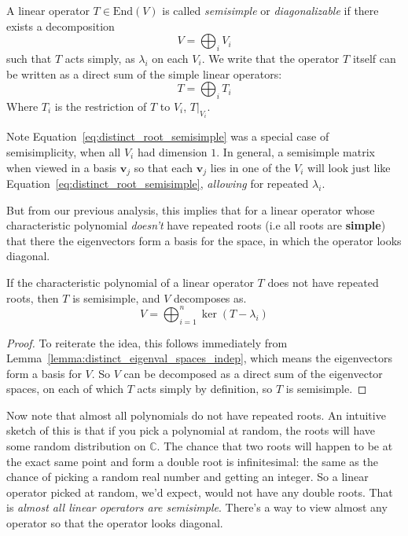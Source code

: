 	\begin{defn}[Semisimplicity]
		A linear operator $T \in \mathrm{End}(V)$ is called \emph{semisimple} or \emph{diagonalizable} if there exists a decomposition 
		\begin{equation}
			V = \bigoplus_i V_i
		\end{equation}
		such that $T$ acts simply, as $\lambda_i$ on each $V_i$. We write that the operator $T$ itself can be written as a direct sum of the simple linear operators:
		\begin{equation}
			T = \bigoplus_i T_i
		\end{equation}
		Where $T_i$ is the restriction of $T$ to $V_i$, $T|_{V_i}$.
	\end{defn}
	
	
	Note Equation~\eqref{eq:distinct_root_semisimple} was a special case of semisimplicity, when all $V_i$ had dimension $1$. In general, a semisimple matrix when viewed in a basis $\mathbf v_j$ so that each $\mathbf v_j$ lies in one of the $V_i$ will look just like Equation~\eqref{eq:distinct_root_semisimple}, \emph{allowing} for repeated $\lambda_i$.
	
	But from our previous analysis, this implies that for a linear operator whose characteristic polynomial \emph{doesn't} have repeated roots (i.e  all roots are \textbf{simple}) that there the eigenvectors form a basis for the space, in which the operator looks diagonal. 
	\begin{theorem}\label{thm:semisimple_lacking_repeated_eigs}
		If the characteristic polynomial of a linear operator $T$ does not have repeated roots, then $T$ is semisimple, and $V$ decomposes as.
		\begin{equation}
			V = \bigoplus_{i=1}^n \ker(T - \lambda_i)
		\end{equation}
	\end{theorem}
	\begin{proof}
		To reiterate the idea, this follows immediately from Lemma~\ref{lemma:distinct_eigenval_spaces_indep}, which means the eigenvectors form a basis for $V$. So $V$ can be decomposed as a direct sum of the eigenvector spaces, on each of which $T$ acts simply by definition, so $T$ is semisimple. 
	\end{proof}
	
	Now note that almost all polynomials do not have repeated roots. An intuitive sketch of this is that if you pick a polynomial at random, the roots will have some random distribution on $\mathbb{C}$. The chance that two roots will happen to be at the exact same point and form a double root is infinitesimal: the same as the chance of picking a random real number and getting an integer. So a linear operator picked at random, we'd expect, would not have any double roots. That is \emph{almost all linear operators are semisimple}. There's a way to view almost any operator so that the operator looks diagonal.
	

